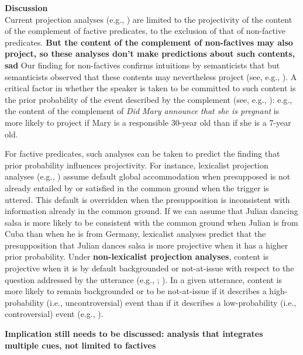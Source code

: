 \documentclass[12pt,fleqn]{article}
\newcommand{\6}{\mbox{$[\hspace*{-.6mm}[$}}
\newcommand{\9}{\mbox{$]\hspace*{-.6mm}]$}}
\begin{document}
\noindent
{\bf Discussion}
\\
Current projection analyses (e.g., \citealt{heim83,vds92,abrusan2011,brst-salt10,brst-ar}) are limited to the projectivity of the content of the complement of factive predicates, to the exclusion of that of non-factive predicates. {\bf But the content of the complement of non-factives may also project, so these analyses don't make predictions about such contents, sad} Our finding for non-factives confirms intuitions by semanticists that but semanticists observed that these contents may nevertheless project (see, e.g., \citealt{schlenker10,anand-hacquard2014,spector-egre2015}). A critical factor in whether the speaker is taken to be committed to such content is the prior probability of the event described by the complement (see, e.g., \citealt{schlenker10}): e.g., the content of the complement of {\em Did Mary announce that she is pregnant} is more likely to project if Mary is a responsible 30-year old than if she is a 7-year old. 

For factive predicates, such analyses can be taken to predict the finding that prior probability influences projectivity. For instance, lexicalist projection analyses (e.g., \citealt{heim83,vds92}) assume default global accommodation when presupposed is not already entailed by or satisfied in the common ground when the trigger is uttered. This default is overridden when the presupposition is inconsistent with information already in the common ground. If we can assume that Julian dancing salsa is more likely to be consistent with the common ground when Julian is from Cuba than when he is from Germany, lexicalist analyses predict that the presupposition that Julian dances salsa is more projective when it has a higher prior probability. Under {\bf non-lexicalist projection analyses}, content is projective when it is by default backgrounded or not-at-issue with respect to the question addressed by the utterance (e.g., \citealt{abrusan2011,abrusan2016,brst-salt10,brst-ar}; \citealt*{tbd-variability}). In a given utterance,  content is more likely to remain backgrounded or to be not-at-issue if it describes a high-probability (i.e., uncontroversial) event than if it describes a low-probability (i.e., controversial) event (e.g., \citealt[252]{simons2003}).

{\bf Implication still needs to be discussed: analysis that integrates multiple cues, not limited to factives}
\newpage


\end{document}

